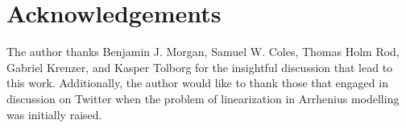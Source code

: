\documentclass[journal=jceda8,manuscript=article]{achemso}
\begin{document}
\section*{Acknowledgements}

The author thanks Benjamin J. Morgan, Samuel W. Coles, Thomas Holm Rod, Gabriel Krenzer, and Kasper Tolborg for the insightful discussion that lead to this work. 
Additionally, the author would like to thank those that engaged in discussion on Twitter when the problem of linearization in Arrhenius modelling was initially raised. 


\end{document}
